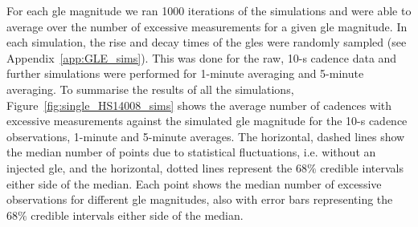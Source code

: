

For each \gls{gle} magnitude we ran 1000 iterations of the simulations and were able to average over the number of excessive measurements for a given \gls{gle} magnitude. In each simulation, the rise and decay times of the \glspl{gle} were randomly sampled (see Appendix~\ref{app:GLE_sims}). This was done for the raw, 10-s cadence data and further simulations were performed for 1-minute averaging and 5-minute averaging. To summarise the results of all the simulations, Figure~\ref{fig:single_HS14008_sims} shows the average number of cadences with excessive measurements against the simulated \gls{gle} magnitude for the 10-s cadence observations, 1-minute and 5-minute averages. The horizontal, dashed lines show the median number of points due to statistical fluctuations, i.e. without an injected \gls{gle}, and the horizontal, dotted lines represent the $68 \%$ credible intervals either side of the median. Each point shows the median number of excessive observations for different \gls{gle} magnitudes, also with error bars representing the $68 \%$ credible intervals either side of the median.


